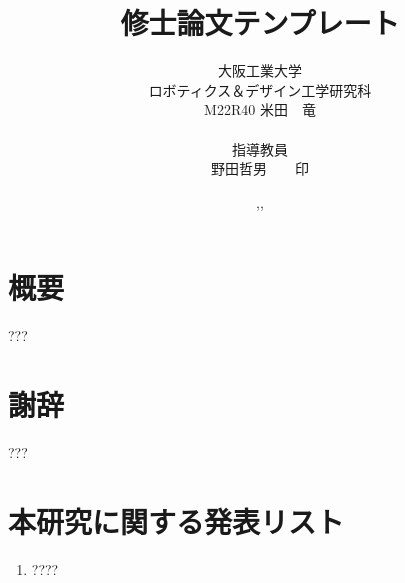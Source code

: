 
%
\title{修士論文テンプレート}
\author{大阪工業大学\\ロボティクス＆デザイン工学研究科\\M22R40  米田　竜\\\\指導教員\\野田哲男　　印}
\date{\the\year,\monthname,\the\day}%
%

%
\maketitle
%	
\pagestyle{empty}
%
\section*{概要}
???
\newpage
\clearpage\setcounter{page}{0}\pagestyle{plain}
\tableofcontents 
\newpage
\listoffigures
\newpage
\listoftables
%
\clearpage\setcounter{page}{0}\pagestyle{plain}



\newpage %
\begin{flushleft}  
\small


\normalsize
\end{flushleft}
%
\newpage %
\section*{謝辞}
???
\section*{本研究に関する発表リスト}%
\begin{enumerate}
  \item ????
\end{enumerate}

